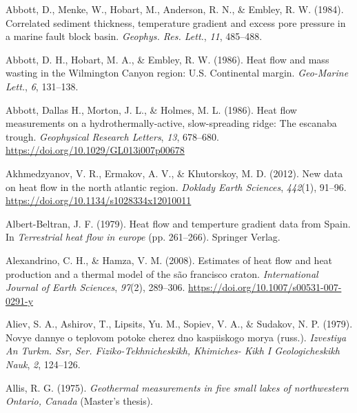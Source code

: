 \hypertarget{refs_tglobe}{}
\begin{CSLReferences}{1}{1}
\leavevmode{}%
Abbott, D., Menke, W., Hobart, M., Anderson, R. N., \& Embley, R. W. (1984). Correlated sediment thickness, temperature gradient and excess pore pressure in a marine fault block basin. \emph{Geophys. Res. Lett.}, \emph{11}, 485--488.

\leavevmode{}%
Abbott, D. H., Hobart, M. A., \& Embley, R. W. (1986). Heat flow and mass wasting in the {Wilmington Canyon} region: {U.S.} Continental margin. \emph{Geo-Marine Lett.}, \emph{6}, 131--138.

\leavevmode{}%
Abbott, Dallas H., Morton, J. L., \& Holmes, M. L. (1986). Heat flow measurements on a hydrothermally-active, slow-spreading ridge: The escanaba trough. \emph{Geophysical Research Letters}, \emph{13}, 678--680. \url{https://doi.org/10.1029/GL013i007p00678}

\leavevmode{}%
Akhmedzyanov, V. R., Ermakov, A. V., \& Khutorskoy, M. D. (2012). New data on heat flow in the north atlantic region. \emph{Doklady Earth Sciences}, \emph{442}(1), 91--96. \url{https://doi.org/10.1134/s1028334x12010011}

\leavevmode{}%
Albert-Beltran, J. F. (1979). Heat flow and temperture gradient data from {Spain}. In \emph{Terrestrial heat flow in europe} (pp. 261--266). Springer Verlag.

\leavevmode{}%
Alexandrino, C. H., \& Hamza, V. M. (2008). Estimates of heat flow and heat production and a thermal model of the são francisco craton. \emph{International Journal of Earth Sciences}, \emph{97}(2), 289--306. \url{https://doi.org/10.1007/s00531-007-0291-y}

\leavevmode{}%
Aliev, S. A., Ashirov, T., Lipsits, Yu. M., Sopiev, V. A., \& Sudakov, N. P. (1979). Novye dannye o teplovom potoke cherez dno kaspiiskogo morya (russ.). \emph{Izvestiya An Turkm. Ssr, Ser. Fiziko-Tekhnicheskikh, Khimiches- Kikh I Geologicheskikh Nauk}, \emph{2}, 124--126.

\leavevmode{}%
Allis, R. G. (1975). \emph{Geothermal measurements in five small lakes of northwestern {Ontario, Canada}} (Master's thesis).


\end{CSLReferences}
